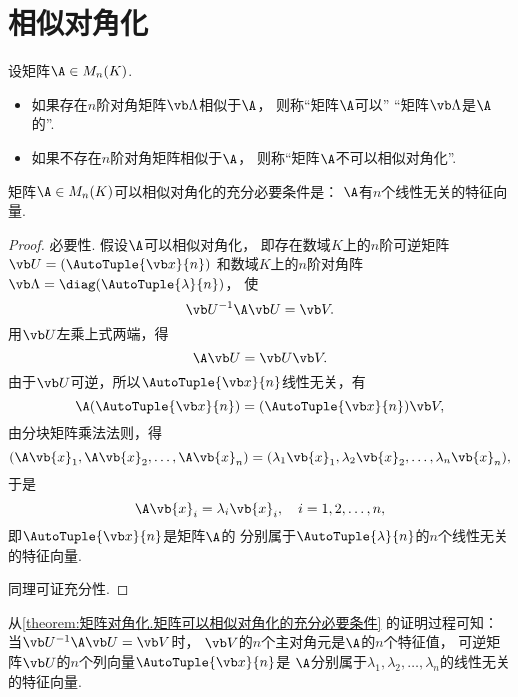 \section{相似对角化}
\begin{definition}
设矩阵\(\A \in M_n(K)\).
\begin{itemize}
	\item 如果存在\(n\)阶对角矩阵\(\vb\Lambda\)相似于\(\A\)，
	则称“矩阵\(\A\)可以”
	“矩阵\(\vb\Lambda\)是\(\A\)的”.
	\item 如果不存在\(n\)阶对角矩阵相似于\(\A\)，
	则称“矩阵\(\A\)不可以{相似对角化}”.
\end{itemize}
\end{definition}

\begin{theorem}\label{theorem:矩阵对角化.矩阵可以相似对角化的充分必要条件}
矩阵\(\A \in M_n(K)\)可以相似对角化的充分必要条件是：
\(\A\)有\(n\)个线性无关的特征向量.
\begin{proof}
必要性.
假设\(\A\)可以相似对角化，
即存在数域\(K\)上的\(n\)阶可逆矩阵\(\P=(\AutoTuple{\x}{n})\)
和数域\(K\)上的\(n\)阶对角阵\(\vb\Lambda=\diag(\AutoTuple{\lambda}{n})\)，
使\[
	\P^{-1}\A\P=\V.
\]
用\(\P\)左乘上式两端，得\[
	\A\P=\P\V.
\]
由于\(\P\)可逆，所以\(\AutoTuple{\x}{n}\)线性无关，有\[
	\A(\AutoTuple{\x}{n})
	=(\AutoTuple{\x}{n})\V,
\]
由分块矩阵乘法法则，得\[
	(\A\vb{x}_1,\A\vb{x}_2,\dotsc,\A\vb{x}_n)
	=(\lambda_1\vb{x}_1,\lambda_2\vb{x}_2,\dotsc,\lambda_n\vb{x}_n),
\]
于是\[
	\A\vb{x}_i=\lambda_i\vb{x}_i,
	\quad i=1,2,\dotsc,n,
\]
即\(\AutoTuple{\x}{n}\)是矩阵\(\A\)的
分别属于\(\AutoTuple{\lambda}{n}\)的\(n\)个线性无关的特征向量.

同理可证充分性.
\end{proof}
\end{theorem}
\begin{remark}
从\cref{theorem:矩阵对角化.矩阵可以相似对角化的充分必要条件} 的证明过程可知：
{\color{red}当\(\P^{-1}\A\P=\V\)时，
\(\V\)的\(n\)个主对角元是\(\A\)的\(n\)个特征值，
可逆矩阵\(\P\)的\(n\)个列向量\(\AutoTuple{\x}{n}\)是
\(\A\)分别属于\(\lambda_1,\lambda_2,\dotsc,\lambda_n\)的线性无关的特征向量.}
\end{remark}

